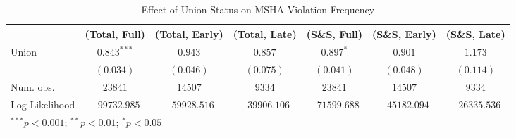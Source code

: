 
\begin{table}
\begin{center}
\begin{tabular}{l c c c c c c}
\hline
 & (Total, Full) & (Total, Early) & (Total, Late) & (S\&S, Full) & (S\&S, Early) & (S\&S, Late) \\
\hline
Union          & $0.843^{***}$ & $0.943$      & $0.857$      & $0.897^{*}$  & $0.901$      & $1.173$      \\
               & $(0.034)$     & $(0.046)$    & $(0.075)$    & $(0.041)$    & $(0.048)$    & $(0.114)$    \\
\hline
Num. obs.      & $23841$       & $14507$      & $9334$       & $23841$      & $14507$      & $9334$       \\
Log Likelihood & $-99732.985$  & $-59928.516$ & $-39906.106$ & $-71599.688$ & $-45182.094$ & $-26335.536$ \\
\hline
\multicolumn{7}{l}{\scriptsize{$^{***}p<0.001$; $^{**}p<0.01$; $^{*}p<0.05$}}
\end{tabular}
\caption{Effect of Union Status on MSHA Violation Frequency}
\label{irr_100employees_violations}
\end{center}
\end{table}

